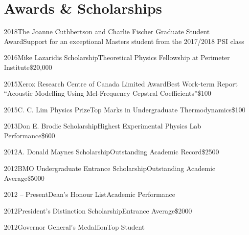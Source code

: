 \documentclass{article}
\begin{document}
    \section{Awards \& Scholarships}
    \begin{awardlist}
        \item{2018}{The Joanne Cuthbertson and Charlie Fischer Graduate Student Award}{Support for an exceptional Masters student from the 2017/2018 PSI class}{}
        \item{2016}{Mike Lazaridis Scholarship}{Theoretical Physics Fellowship at Perimeter Institute}{\$20,000}
        \item{2015}{Xerox Research Centre of Canada Limited Award}{Best Work-term Report ``Acoustic Modelling Using Mel-Frequency Cepstral Coefficients''}{\$100}
        \item{2015}{C. C. Lim Physics Prize}{Top Marks in Undergraduate Thermodynamics}{\$100}
        \item{2013}{Don E. Brodie Scholarship}{Highest Experimental Physics Lab Performance}{\$600}
        \item{2012}{A. Donald Maynes Scholarship}{Outstanding Academic Record}{\$2500}
        \item{2012}{BMO Undergraduate Entrance Scholarship}{Outstanding Academic Average}{\$5000}
        \item{2012 -- Present}{Dean's Honour List}{Academic Performance}{}
        \item{2012}{President's Distinction Scholarship}{Entrance Average}{\$2000}
        \item{2012}{Governor General's Medallion}{Top Student}{}
    \end{awardlist}
    \clearpage
\end{document}
